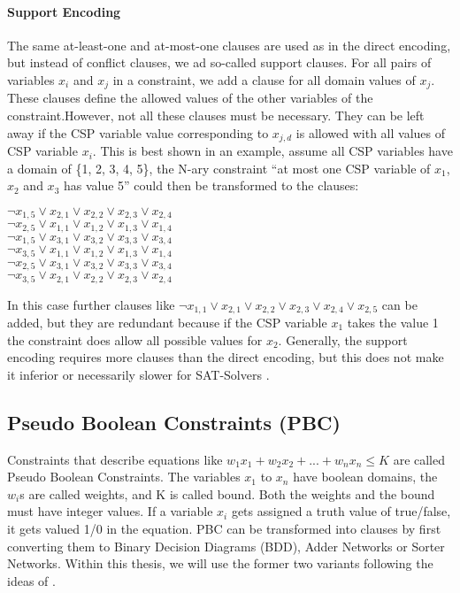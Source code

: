 \paragraph{Support Encoding \cite{kasif1990OnTheParallelComplexityOfDiscreteRelaxationInConstraintSatisfactionNetworks}\cite{gent20002ArcConsistencyInSAT}}
The same at-least-one and at-most-one clauses are used as in the direct encoding, but instead of conflict clauses, we ad so-called support clauses. For all pairs of variables $x_i$ and $x_j$ in a constraint, we add a clause for all domain values of $x_j$. These clauses define the allowed values of the other variables of the constraint.However, not all these clauses must be necessary. They can be left away if the CSP variable value corresponding to $x_{j,d}$ is allowed with all values of CSP variable $x_i$. 
This is best shown in an example, assume all CSP variables have a domain of \{1, 2, 3, 4, 5\}, the N-ary constraint ``at most one CSP variable of $x_1$, $x_2$ and $x_3$ has value 5” could then be transformed to the clauses:
\begin{center}
 $\neg x_{1,5} \lor x_{2,1} \lor x_{2,2} \lor x_{2,3} \lor x_{2,4}$\\
 $\neg x_{2,5} \lor x_{1,1} \lor x_{1,2} \lor x_{1,3} \lor x_{1,4}$\\
 $\neg x_{1,5} \lor x_{3,1} \lor x_{3,2} \lor x_{3,3} \lor x_{3,4}$\\
 $\neg x_{3,5} \lor x_{1,1} \lor x_{1,2} \lor x_{1,3} \lor x_{1,4}$\\
 $\neg x_{2,5} \lor x_{3,1} \lor x_{3,2} \lor x_{3,3} \lor x_{3,4}$\\
 $\neg x_{3,5} \lor x_{2,1} \lor x_{2,2} \lor x_{2,3} \lor x_{2,4}$\\
\end{center}
In this case further clauses like $\neg x_{1,1} \lor x_{2,1} \lor x_{2,2} \lor x_{2,3} \lor x_{2,4} \lor x_{2,5}$ can be added, but they are redundant because if the CSP variable $x_1$ takes the value 1 the constraint does allow all possible values for $x_2$. Generally, the support encoding requires more clauses than the direct encoding, but this does not make it inferior or necessarily slower for SAT-Solvers \cite{gent20002ArcConsistencyInSAT}. 


\subsection{Pseudo Boolean Constraints (PBC)}
Constraints that describe equations like $w_1x_1+w_2x_2+...+w_nx_n \leq K$ are called Pseudo Boolean Constraints. The variables $x_1$ to $x_n$ have boolean domains, the $w_i$s are called weights, and K is called bound. Both the weights and the bound must have integer values. If a variable $x_i$ gets assigned a truth value of true/false, it gets valued 1/0 in the equation. PBC can be transformed into clauses by first converting them to Binary Decision Diagrams (BDD), Adder Networks or Sorter Networks. Within this thesis, we will use the former two variants following the ideas of \cite{En2006TranslatingPC}.

